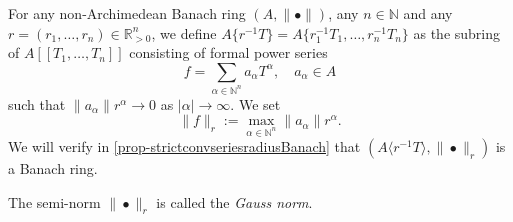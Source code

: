 \begin{example}\label{ex-strictconvseriesradius}
    For any non-Archimedean Banach ring $(A,\|\bullet\|)$, any $n\in \mathbb{N}$ and any $r=(r_1,\ldots,r_n)\in \mathbb{R}^n_{>0}$, we define $A\{ r^{-1}T \} =A\{ r_1^{-1}T_1,\ldots, r_n^{-1}T_n \}$ as the subring of $A[[T_1,\ldots,T_n]]$ consisting of formal power series
    \[
      f=\sum_{\alpha\in \mathbb{N}^{n}} a_{\alpha}T^{\alpha},\quad a_{\alpha}\in A  
    \]
    such that $\|a_{\alpha}\|r^{\alpha}\to 0$ as $|\alpha|\to\infty$. We set
    \[
        \|f\|_r:=   \max_{\alpha\in \mathbb{N}^{n}} \|a_{\alpha}\|r^{\alpha}.
    \]
    We will verify in \cref{prop-strictconvseriesradiusBanach} that $(A\langle r^{-1}T \rangle ,\|\bullet\|_r)$ is a Banach ring.

    The semi-norm $\|\bullet\|_r$ is called the \emph{Gauss norm}. 
\end{example}

